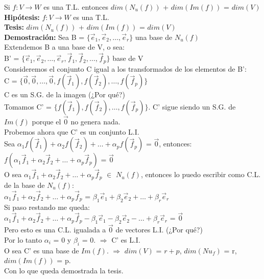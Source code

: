 \documentclass[11pt]{article}
\begin{document}
\vspace{2mm} \noindent
Si $f: V \rightarrow W$ es una T.L. entonces $dim(N_u(f))$ + $dim(Im(f))$ = $dim(V)$\\
{\bfseries Hipótesis:} $f: V \rightarrow W$ es una T.L. \\
{\bfseries Tesis:} $dim(N_u(f))$ + $dim(Im(f))$ = $dim(V)$ \\
{\bfseries Demostración:} Sea B = $\{\vec{e}_1, \vec{e}_2, \hdots, \vec{e}_r\}$ una base de $N_u(f)$ \\
Extendemos B a una base de V, o sea: \\
B' = $\{\vec{e}_1, \vec{e}_2, \hdots, \vec{e}_r, \vec{f}_1, \vec{f}_2, \hdots, \vec{f}_p\}$ base de V \\
Consideremos el conjunto C igual a los transformados de los elementos de B':\\
C = $\{\vec{0}, \vec{0}, \hdots, \vec{0}, f(\vec{f}_1), f(\vec{f}_2), \hdots, f(\vec{f}_p)\}$\\
C es un S.G. de la imagen (¿Por qué?)\\
Tomamos C' = $\{f(\vec{f}_1), f(\vec{f}_2), \hdots, f(\vec{f}_p)\}$. C' sigue siendo un S.G. de $Im(f)$ porque el $\vec{0}$ no genera nada. \\
Probemos ahora que C' es un conjunto L.I.\\
Sea $\alpha_1 f(\vec{f}_1) + \alpha_2 f(\vec{f}_2) + \hdots + \alpha_p f(\vec{f}_p)$ = $\vec{0}$, entonces: \\
$f(\alpha_1 \vec{f}_1 + \alpha_2 \vec{f}_2 + \hdots + \alpha_p \vec{f}_p)$ = $\vec{0}$ \\
O sea $\alpha_1 \vec{f}_1 + \alpha_2 \vec{f}_2 + \hdots + \alpha_p \vec{f}_p$ $\in$ $N_u(f)$, entonces lo puedo escribir como C.L. de la base de $N_u(f)$: \\
$\alpha_1 \vec{f}_1 + \alpha_2 \vec{f}_2 + \hdots + \alpha_p \vec{f}_p$ = $\beta_1 \vec{e}_1 + \beta_2 \vec{e}_2 + \hdots + \beta_r \vec{e}_r$ \\
Si paso restando me queda: \\
$\alpha_1 \vec{f}_1 + \alpha_2 \vec{f}_2 + \hdots + \alpha_p \vec{f}_p - \beta_1 \vec{e}_1 - \beta_2 \vec{e}_2 - \hdots + \beta_r \vec{e}_r $ = $\vec{0}$ \\
Pero esto es una C.L. igualada a $\vec{0}$ de vectores L.I. (¿Por qué?) \\
Por lo tanto $\alpha_i$ = 0 y $\beta_i$ = 0. $\Rightarrow$ C' es L.I. \\
O sea C' es una base de $Im(f)$. 
$\Rightarrow$ $dim(V)$ = $r+p$, $dim(Nu_f)$ = r, $dim(Im(f))$ = p.\\
Con lo que queda demostrada la tesis.
\end{document}
